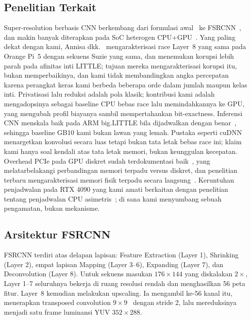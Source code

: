 \documentclass[conference]{IEEEtran}
\begin{document}
\subsection{Penelitian Terkait}
Super-resolution berbasis CNN berkembang dari formulasi awal~\cite{dong2014srcnn} ke FSRCNN~\cite{dong2016fsrcnn}, dan makin banyak diterapkan pada SoC heterogen CPU+GPU~\cite{nvidiagracehopper2022,wahlgren2025upm}. Yang paling dekat dengan kami, Annisa dkk.~\cite{annisa2025} mengarakterisasi race Layer~8 yang sama pada Orange Pi~5 dengan sekuens Suzie yang sama, dan menemukan korupsi lebih parah pada afinitas inti LITTLE; tujuan mereka mengarakterisasi korupsi itu, bukan memperbaikinya, dan kami tidak membandingkan angka percepatan karena perangkat keras kami berbeda beberapa orde dalam jumlah maupun kelas inti. Privatisasi lalu reduksi adalah pola klasik; kontribusi kami adalah mengadopsinya sebagai baseline CPU bebas race lalu memindahkannya ke GPU, yang mengubah profil biayanya sambil mempertahankan bit-exactness. Inferensi CNN menskala baik pada ARM big.LITTLE bila dijadwalkan dengan benar~\cite{wang2020pipeit}, sehingga baseline GB10 kami bukan lawan yang lemah. Pustaka seperti cuDNN~\cite{chetlur2014cudnn} menargetkan konvolusi secara luas tetapi bukan tata letak bebas race ini; klaim kami hanya soal kendali atas tata letak memori, bukan keunggulan kecepatan. Overhead PCIe pada GPU diskret sudah terdokumentasi baik~\cite{go2017apunet}, yang melatarbelakangi perbandingan memori terpadu versus diskret, dan penelitian terbaru mengarakterisasi memori fisik terpadu secara langsung~\cite{wahlgren2025upm}. Keruntuhan penjadwalan pada RTX 4090 yang kami amati berkaitan dengan penelitian tentang penjadwalan CPU asimetris~\cite{bilbao2023pmcsched,eichenberger2012ompaffinity}; di sana kami menyumbang sebuah pengamatan, bukan mekanisme.

\subsection{Arsitektur FSRCNN}
FSRCNN terdiri atas delapan lapisan: Feature Extraction (Layer 1), Shrinking (Layer 2), empat lapisan Mapping (Layer 3--6), Expanding (Layer 7), dan Deconvolution (Layer 8). Untuk sekuens masukan $176{\times}144$ yang diskalakan $2\times$, Layer 1--7 seluruhnya bekerja di ruang resolusi rendah dan menghasilkan 56 peta fitur. Layer~8 kemudian melakukan upscaling. Ia mengambil ke-56 kanal itu, menerapkan transposed convolution $9{\times}9$~\cite{dumoulin2016convolution} dengan stride 2, lalu mereduksinya menjadi satu frame luminansi YUV $352{\times}288$.
\end{document}
